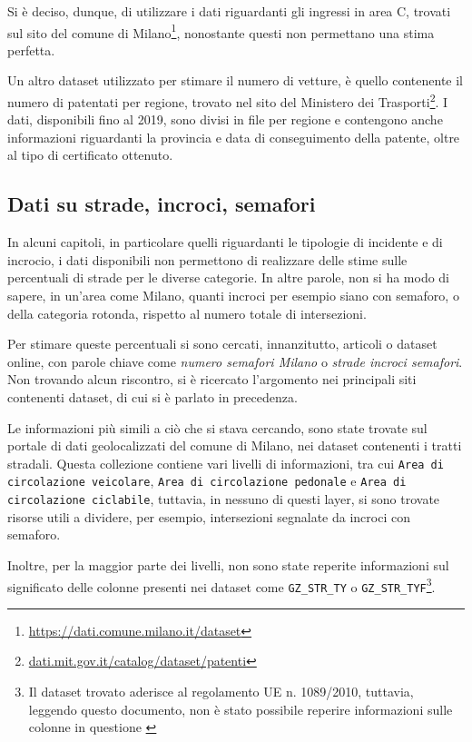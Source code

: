 \documentclass[a4paper,12pt]{report}
\newcommand{\columnstyle}[1]{\texttt{#1}}
\newcommand{\quotestyle}[1]{\textit{#1}}
\begin{document}
Si è deciso, dunque, di utilizzare i dati riguardanti gli ingressi in area C, 
trovati sul sito del comune di Milano\footnote{\url{https://dati.comune.milano.it/dataset}}, 
nonostante questi non permettano una stima perfetta. 

Un altro dataset utilizzato per stimare il numero di vetture, è quello contenente 
il numero di patentati per regione, trovato nel sito del Ministero dei 
Trasporti\footnote{\url{dati.mit.gov.it/catalog/dataset/patenti}}. 
I dati, disponibili fino al 2019, sono divisi in file per regione e 
contengono anche informazioni riguardanti la provincia e data di conseguimento della 
patente, oltre al tipo di certificato ottenuto. 

\subsection{Dati su strade, incroci, semafori}

In alcuni capitoli, in particolare quelli riguardanti le tipologie di incidente e 
di incrocio, i dati disponibili non permettono di realizzare delle stime sulle 
percentuali di strade per le diverse categorie. 
In altre parole, non si ha modo di sapere, in un'area come Milano, quanti incroci 
per esempio siano con semaforo, o della categoria rotonda, 
rispetto al numero totale di intersezioni. 

Per stimare queste percentuali si sono cercati, innanzitutto, articoli o dataset online, con 
parole chiave come \quotestyle{numero semafori Milano} o \quotestyle{strade incroci semafori}. 
Non trovando alcun riscontro, si è ricercato l'argomento nei principali siti contenenti 
dataset, di cui si è parlato in precedenza. 

Le informazioni più simili a ciò che si stava cercando, 
sono state trovate sul portale di dati geolocalizzati 
del comune di Milano, nei dataset contenenti i tratti stradali. 
Questa collezione contiene vari livelli di informazioni, tra cui 
\columnstyle{Area di circolazione veicolare}, 
\columnstyle{Area di circolazione pedonale} e \columnstyle{Area di circolazione ciclabile}, 
tuttavia, in nessuno di questi layer, si sono trovate risorse utili a dividere, 
per esempio, intersezioni segnalate da incroci con semaforo. 

Inoltre, per la maggior parte dei livelli, non sono state reperite informazioni 
sul significato delle colonne presenti nei dataset come \columnstyle{GZ\_STR\_TY} o 
\columnstyle{GZ\_STR\_TYF}\footnote{Il dataset trovato aderisce al regolamento UE n. 1089/2010, 
tuttavia, leggendo questo documento, non è stato possibile reperire informazioni sulle colonne 
in questione \cite{REGOLAMENTOUE:1}}. 
\end{document}
